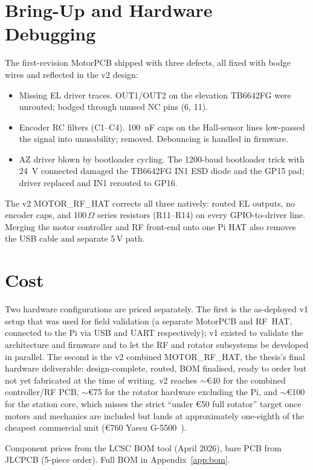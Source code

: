 \section{Bring-Up and Hardware Debugging}
\label{sec:bringup}

The first-revision MotorPCB shipped with three defects, all fixed with bodge wires and reflected in the v2 design:
\begin{itemize}
    \item Missing EL driver traces. OUT1/OUT2 on the elevation TB6642FG were unrouted; bodged through unused NC pins (6, 11).
    \item Encoder RC filters (C1--C4). 100~nF caps on the Hall-sensor lines low-passed the signal into unusability; removed. Debouncing is handled in firmware.
    \item AZ driver blown by bootloader cycling. The 1200-baud bootloader trick with 24~V connected damaged the TB6642FG IN1 ESD diode and the GP15 pad; driver replaced and IN1 rerouted to GP16.
\end{itemize}

The v2 MOTOR\_RF\_HAT corrects all three natively: routed EL outputs, no encoder caps, and 100\,$\Omega$ series resistors (R11--R14) on every GPIO-to-driver line. Merging the motor controller and RF front-end onto one Pi HAT also removes the USB cable and separate 5\,V path.

\section{Cost}
\label{sec:cost}

Two hardware configurations are priced separately. The first is the as-deployed v1 setup that was used for field validation (a separate MotorPCB and RF~HAT, connected to the Pi via USB and UART respectively); v1 existed to validate the architecture and firmware and to let the RF and rotator subsystems be developed in parallel. The second is the v2 combined MOTOR\_RF\_HAT, the thesis's final hardware deliverable: design-complete, routed, BOM finalised, ready to order but not yet fabricated at the time of writing. v2 reaches $\sim$€40 for the combined controller/RF PCB, $\sim$€75 for the rotator hardware excluding the Pi, and $\sim$€100 for the station core, which misses the strict ``under €50 full rotator'' target once motors and mechanics are included but lands at approximately one-eighth of the cheapest commercial unit (€760 Yaesu G-5500~\cite{yaesu-g5500}).

Component prices from the LCSC BOM tool (April 2026), bare PCB from JLCPCB (5-piece order). Full BOM in Appendix~\ref{app:bom}.

